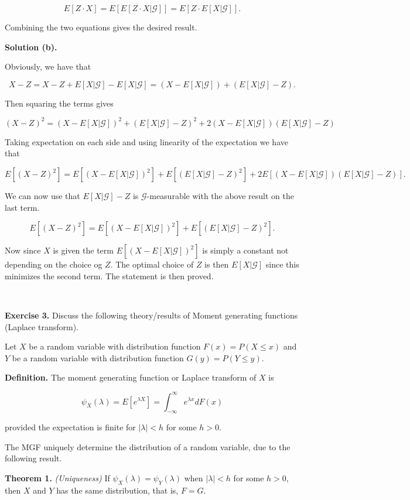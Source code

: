 \documentclass[
]{article}
\begin{document}
\[E\left[Z\cdot X\right]=E\left[E[Z\cdot X\vert\mathcal{G}]\right]=E\left[Z\cdot E[ X\vert\mathcal{G}]\right].\]

Combining the two equations gives the desired result.

\textbf{Solution (b).}

Obviously, we have that

\[X-Z=X-Z+E[X\vert\mathcal{G}]-E[X\vert\mathcal{G}]=(X-E[X\vert\mathcal{G}])+(E[X\vert\mathcal{G}]-Z).\]

Then squaring the terms gives

\[(X-Z)^2=(X-E[X\vert\mathcal{G}])^2+(E[X\vert\mathcal{G}]-Z)^2+2(X-E[X\vert\mathcal{G}])(E[X\vert\mathcal{G}]-Z)\]

Taking expectation on each side and using linearity of the expectation
we have that

\[E[(X-Z)^2]=E\left[(X-E[X\vert\mathcal{G}])^2\right]+E\left[(E[X\vert\mathcal{G}]-Z)^2\right]+2E\left[(X-E[X\vert\mathcal{G}])(E[X\vert\mathcal{G}]-Z)\right].\]

We can now use that \(E[X\vert\mathcal{G}]-Z\) is
\(\mathcal{G}\)-measurable with the above result on the last term.

\[E[(X-Z)^2]=E\left[(X-E[X\vert\mathcal{G}])^2\right]+E\left[(E[X\vert\mathcal{G}]-Z)^2\right].\]

Now since \(X\) is given the term
\(E\left[(X-E[X\vert\mathcal{G}])^2\right]\) is simply a constant not
depending on the choice og \(Z\). The optimal choice of \(Z\) is then
\(E[X\vert\mathcal{G}]\) since this minimizes the second term. The
statement is then proved.

~

\textbf{Exercise 3.} Discuss the following theory/results of Moment
generating functions (Laplace transform).

Let \(X\) be a random variable with distribution function
\(F(x)=P(X\le x)\) and \(Y\) be a random variable with distribution
function \(G(y)=P(Y\le y)\).

\textbf{Definition.} The moment generating function or Laplace transform
of \(X\) is

\[\psi_X(\lambda)=E\left[e^{\lambda X}\right]=\int_{-\infty}^\infty e^{\lambda x}dF(x)\]

provided the expectation is finite for \(\vert\lambda\vert<h\) for some
\(h>0\).

The MGF uniquely determine the distribution of a random variable, due to
the following result.

\textbf{Theorem 1.} \emph{(Uniqueness)} If
\(\psi_X(\lambda)=\psi_Y(\lambda)\) when \(\vert\lambda\vert<h\) for
some \(h>0\), then \(X\) and \(Y\) has the same distribution, that is,
\(F=G\).
\end{document}
